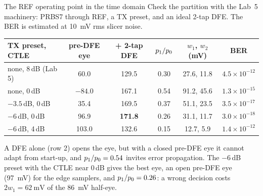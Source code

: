 \begin{example}{The REF operating point in the time domain}\label{we:ch8-refop}
Check the partition with the Lab~5 machinery: PRBS7 through REF, a TX preset,  and an ideal 2-tap DFE. The BER is estimated at \qty{10}{\milli\volt} rms slicer noise.
\begin{center}\small
\begin{tabular}{@{}lccccc@{}}
\toprule
TX preset, CTLE & pre-DFE eye & + 2-tap DFE & $p_{1}/p_{0}$ & $w_1$, $w_2$ (mV) & BER \\
\midrule
none, 8\,dB (Lab 5) & 60.0 & 129.5 & 0.30 & 27.6, 11.8 & $4.5\times10^{-12}$\\
none, 0\,dB         & $-84.0$ & 167.1 & 0.54 & 91.2, 45.6 & $1.3\times10^{-15}$\\
$-3.5$\,dB, 0\,dB   & 35.4 & 169.5 & 0.37 & 51.1, 23.5 & $3.5\times10^{-17}$\\
$-6$\,dB, 0\,dB     & 96.9 & \textbf{171.8} & 0.26 & 31.1, 11.7 & $3.0\times10^{-18}$\\
$-6$\,dB, 4\,dB     & 103.0 & 132.6 & 0.15 & 12.7, 5.9 & $1.4\times10^{-12}$\\
\bottomrule
\end{tabular}
\end{center}
A DFE alone (row 2) opens the eye, but with a closed pre-DFE eye it cannot adapt from start-up, and $p_{1}/p_{0}=0.54$ invites error propagation. The $-6$\,dB preset with the CTLE near 0\,dB gives the best eye, an open pre-DFE eye (\qty{97}{\milli\volt}) for the edge samplers, and $p_{1}/p_{0}=0.26$: a wrong decision costs $2w_1=\qty{62}{\milli\volt}$ of the \qty{86}{\milli\volt} half-eye.
\end{example}

